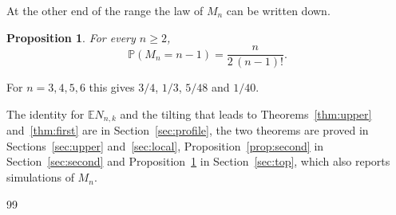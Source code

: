 \documentclass[11pt]{amsart}
\newtheorem{proposition}[theorem]{Proposition}
\theoremstyle{definition}
\newcommand{\Prob}{\mathbb{P}}
\newcommand{\E}{\mathbb{E}}
\begin{document}
At the other end of the range the law of $M_n$ can be written down.

\begin{proposition}\label{prop:top}
For every $n\ge2$,
\[
\Prob(M_n=n-1)=\frac{n}{2\,(n-1)!}.
\]
\end{proposition}

For $n=3,4,5,6$ this gives $3/4$, $1/3$, $5/48$ and $1/40$.

The identity for $\E N_{n,k}$ and the tilting that leads to Theorems~\ref{thm:upper} and~\ref{thm:first} are in
Section~\ref{sec:profile}, the two theorems are proved in Sections~\ref{sec:upper} and~\ref{sec:local},
Proposition~\ref{prop:second} in Section~\ref{sec:second} and Proposition~\ref{prop:top} in Section~\ref{sec:top},
which also reports simulations of $M_n$.









\begin{thebibliography}{99}


\end{thebibliography}
\end{document}
